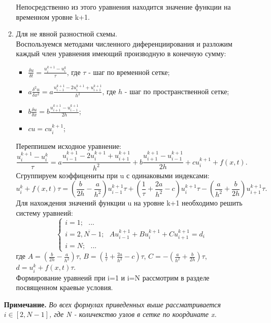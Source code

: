 \documentclass[12pt]{article}
\begin{document}
\begin{enumerate}
\begin{enumerate}
        Непосредственно из этого уравнения находится значение функции на временном уровне k+1.
    \item Для не явной разностной схемы.
        \\Воспользуемся методами численного диференциирования и разложим каждый член уравнения имеющий производную в конечную сумму:
        \begin{itemize}
            \item $\frac{\delta u}{\delta t}=\frac{u_i^{k+1}-u_i^{k}}{\tau}$, где  $\tau$ - шаг по временной сетке;
            \item $a\frac{\delta^2 u}{\delta x^2} = a\frac{u_{i-1}^{k+1}-2u_{i}^{k+1}+u_{i+1}^{k+1}}{h^2}$, где  $h$ - шаг по пространственной сетке;
            \item $b\frac{\delta u}{\delta x} = b\frac{u_{i+1}^{k+1}-u_{i-1}^{k+1}}{2h}$;
            \item $cu = cu_{i}^{k+1}$;
        \end{itemize}
        Переппишем исходное уравнение:
        $$\frac{u_i^{k+1}-u_i^{k}}{\tau} =a\frac{u_{i-1}^{k+1}-2u_{i}^{k+1}+u_{i+1}^{k+1}}{h^2}+b\frac{u_{i+1}^{k+1}-u_{i-1}^{k+1}}{2h}+cu_{i}^{k+1}+f(x,t).$$
        Сгруппируем коэффицениты при u с одинаковыми индексами:
        $$u_i^{k}+f(x,t)\tau = \left(\frac{b}{2h}-\frac{a}{h^2} \right)u_{i-1}^{k+1}\tau + \left(\frac{1}{\tau}+\frac{2a}{h^2}-c\right)u_i^{k+1}\tau -
        \left(\frac{a}{h^2}+\frac{b}{2h}\right)u_{i+1}^{k+1}\tau.$$
        Для нахождения значений функции u на уровне k+1 необходимо решить систему уравнеий:
        \begin{equation*}
            \begin{cases}
                i=1;\:\:\: ...
                \\
                i=\overline{2,N-1};\:\:\:Au_{i-1}^{k+1} + Bu_i^{k+1} +Cu_{i+1}^{k+1}=d_i
                \\
                i=N;\:\:\: ...
            \end{cases}
        \end{equation*}
        где $A = \left(\frac{b}{2h}-\frac{a}{h^2} \right)\tau$, $B = \left(\frac{1}{\tau}+\frac{2a}{h^2}-c\right)\tau$, $C = -\left(\frac{a}{h^2}+\frac{b}{2h}\right)\tau$, 
        $d = u_i^{k}+f(x,t)\tau$.\\
        Формирование уравнеий при i=1 и i=N рассмотрим в разделе посвященном краевые условия.
    \end{enumerate}
    \textbf{Примечание.}
    \emph{Во всех формулах приведенных выше рассматривается $i \in [2,N-1]$, где N - количекство узлов в сетке по координате x.}


\end{enumerate}
\end{document}
